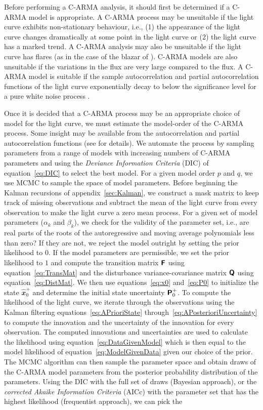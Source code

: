\documentclass[a4paper,fleqn,usenatbib]{mnras}
\begin{document}
Before performing a C-ARMA analysis, it should first be determined if a C-ARMA model is appropriate. A C-ARMA process may be unsuitable if the light curve exhibits non-stationary behaviour, i.e., (1) the appearance of the light curve changes dramatically at some point in the light curve or (2) the light curve has a marked trend. A C-ARMA analysis may also be unsuitable if the light curve has flares (as in the case of the blazar of \citealp{Edelson13}). C-ARMA models are also unsuitable if the variations in the flux are very large compared to the flux. A C-ARMA model is suitable if the sample autocorrelation and partial autocorrelation functions of the light curve exponentially decay to below the significance level for a pure white noise process \citep{BrockwellDavisITSF}.

Once it is decided that a C-ARMA process may be an appropriate choice of model for the light curve, we must estimate the model-order of the C-ARMA process. Some insight may be available from the autocorrelation and partial autocorrelation functions (see \citealp{BrockwellDavisITSF} for details). We automate the process by sampling parameters from a range of models with increasing numbers of C-ARMA parameters and using the \textit{Deviance Information Criteria} (DIC) of equation~\eqref{eq:DIC} to select the best model. For a given model order $p$ and $q$, we use MCMC to sample the space of model parameters. Before beginning the Kalman recursions of appendix~\ref{sec:Kalman}, we construct a mask matrix to keep track of missing observations and subtract the mean of the light curve from every observation to make the light curve a zero mean process. For a given set of model parameters ($\alpha_{k}$ and $\beta_{k}$), we check for the validity of the parameter set, i.e., are real parts of the roots of the autoregressive and moving average polynomials less than zero? If they are not, we reject the model outright by setting the prior likelihood to $0$. If the model parameters are permissible, we set the prior likelihood to $1$ and compute the transition matrix $\textbf{\textsf{F}}$ using equation~\eqref{eq:TransMat} and the disturbance variance-covariance matrix $\textbf{\textsf{Q}}$ using equation~\eqref{eq:DistMat}. We then use equations~\eqref{eq:x0} and~\eqref{eq:P0} to initialize the state $\widehat{\mathbfit{x}}^{+}_{0}$ and determine the initial state uncertainty $\textbf{\textsf{P}}^{+}_{0}$. To compute the likelihood of the light curve, we iterate through the observations using the Kalman filtering equations~\eqref{eq:APrioriState} through~\eqref{eq:APosterioriUncertainty} to compute the innovation and the uncertainty of the innovation for every observation. The computed innovations and uncertainties are used to calculate the likelihood using equation~\eqref{eq:DataGivenModel} which is then equal to the model likelihood of equation~\eqref{eq:ModelGivenData} given our choice of the prior. The MCMC algorithm can then sample the parameter space and obtain draws of the C-ARMA model parameters from the posterior probability distribution of the parameters. Using the DIC with the full set of draws (Bayesian approach), or the \textit{corrected Akaike Information Criteria} (AICc) with the parameter set that has the highest likelihood (frequentist approach), we can pick the 
\end{document}
